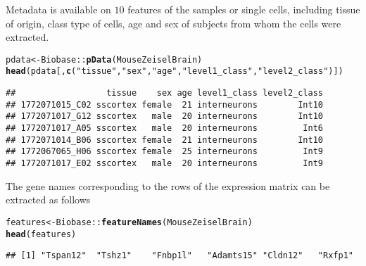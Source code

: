 \documentclass[12pt]{article}\usepackage[]{graphicx}\usepackage[usenames,dvipsnames]{color}
\makeatletter
\newcommand{\hlstr}[1]{\textcolor[rgb]{0.192,0.494,0.8}{#1}}%
\newcommand{\hlopt}[1]{\textcolor[rgb]{0,0,0}{#1}}%
\newcommand{\hlstd}[1]{\textcolor[rgb]{0.345,0.345,0.345}{#1}}%
\newcommand{\hlkwb}[1]{\textcolor[rgb]{0.69,0.353,0.396}{#1}}%
\newcommand{\hlkwd}[1]{\textcolor[rgb]{0.737,0.353,0.396}{\textbf{#1}}}%
\newenvironment{kframe}{%
 \def\at@end@of@kframe{}%
 \ifinner\ifhmode%
  \def\at@end@of@kframe{\end{minipage}}%
  \begin{minipage}{\columnwidth}%
 \fi\fi%
 \def\FrameCommand##1{\hskip\@totalleftmargin \hskip-\fboxsep
 \colorbox{shadecolor}{##1}\hskip-\fboxsep
     \hskip-\linewidth \hskip-\@totalleftmargin \hskip\columnwidth}%
 \MakeFramed {\advance\hsize-\width
   \@totalleftmargin\z@ \linewidth\hsize
   \@setminipage}}%
 {\par\unskip\endMakeFramed%
 \at@end@of@kframe}
\newenvironment{knitrout}{}{} %
\makeatother
\begin{document}
Metadata is available on $10$ features of the samples or single cells,
including tissue of origin, class type of cells, age and sex of subjects from
whom the cells were extracted.

\begin{knitrout}
\color{fgcolor}\begin{kframe}
\begin{alltt}
\hlstd{pdata} \hlkwb{<-} \hlstd{Biobase}\hlopt{::}\hlkwd{pData}\hlstd{(MouseZeiselBrain)}
\hlkwd{head}\hlstd{(pdata[,}\hlkwd{c}\hlstd{(}\hlstr{"tissue"}\hlstd{,}\hlstr{"sex"}\hlstd{,}\hlstr{"age"}\hlstd{,}\hlstr{"level1_class"}\hlstd{,}\hlstr{"level2_class"}\hlstd{)])}
\end{alltt}
\begin{verbatim}
##                  tissue    sex age level1_class level2_class
## 1772071015_C02 sscortex female  21 interneurons        Int10
## 1772071017_G12 sscortex   male  20 interneurons        Int10
## 1772071017_A05 sscortex   male  20 interneurons         Int6
## 1772071014_B06 sscortex female  21 interneurons        Int10
## 1772067065_H06 sscortex female  25 interneurons         Int9
## 1772071017_E02 sscortex   male  20 interneurons         Int9
\end{verbatim}
\end{kframe}
\end{knitrout}

The gene names corresponding to the rows of the expression matrix can be extracted
as follows

\begin{knitrout}
\color{fgcolor}\begin{kframe}
\begin{alltt}
\hlstd{features} \hlkwb{<-} \hlstd{Biobase}\hlopt{::}\hlkwd{featureNames}\hlstd{(MouseZeiselBrain)}
\hlkwd{head}\hlstd{(features)}
\end{alltt}
\begin{verbatim}
## [1] "Tspan12"  "Tshz1"    "Fnbp1l"   "Adamts15" "Cldn12"   "Rxfp1"
\end{verbatim}
\end{kframe}
\end{knitrout}
\end{document}
